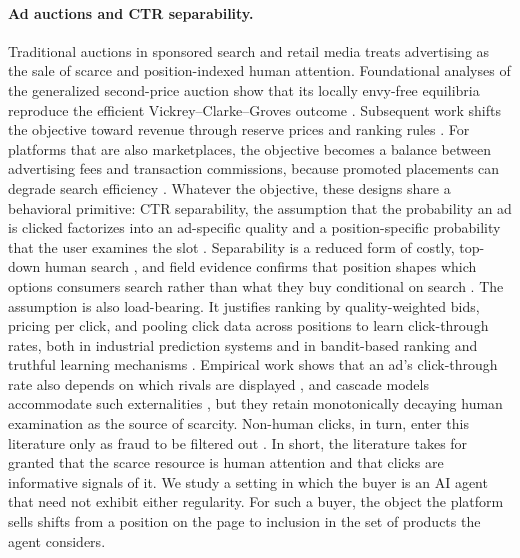 \documentclass[opre,dblanonrev]{informs4}
\providecommand{\1}{\mathbf{1}}
\begin{document}
\paragraph{Ad auctions and CTR separability.}
Traditional auctions in sponsored search and retail media treats advertising as the sale of scarce and position-indexed human attention. Foundational analyses of the generalized second-price auction show that its locally envy-free equilibria reproduce the efficient Vickrey--Clarke--Groves outcome \citep{edelman2007internet,varian2007position,aggarwal2006truthful}. Subsequent work shifts the objective toward revenue through reserve prices and ranking rules \citep{edelman2010optimal,lahaie2007revenue,ostrovsky2023reserve}. For platforms that are also marketplaces, the objective becomes a balance between advertising fees and transaction commissions, because promoted placements can degrade search efficiency \citep{choi2019monetizing,long2022designing}. Whatever the objective, these designs share a behavioral primitive: CTR separability, the assumption that the probability an ad is clicked factorizes into an ad-specific quality and a position-specific probability that the user examines the slot \citep{richardson2007predicting,craswell2008experimental}. Separability is a reduced form of costly, top-down human search \citep{athey2011position}, and field evidence confirms that position shapes which options consumers search rather than what they buy conditional on search \citep{ursu2018power}. The assumption is also load-bearing. It justifies ranking by quality-weighted bids, pricing per click, and pooling click data across positions to learn click-through rates, both in industrial prediction systems and in bandit-based ranking and truthful learning mechanisms \citep{graepel2010web,joachims2017unbiased,kveton2015cascading,babaioff2014characterizing}. Empirical work shows that an ad's click-through rate also depends on which rivals are displayed \citep{jeziorski2015makes}, and cascade models accommodate such externalities \citep{kempe2008cascade,aggarwal2008sponsored}, but they retain monotonically decaying human examination as the source of scarcity. Non-human clicks, in turn, enter this literature only as fraud to be filtered out \citep{wilbur2009click}. In short, the literature takes for granted that the scarce resource is human attention and that clicks are informative signals of it. We study a setting in which the buyer is an AI agent that need not exhibit either regularity. For such a buyer, the object the platform sells shifts from a position on the page to inclusion in the set of products the agent considers.
\end{document}
